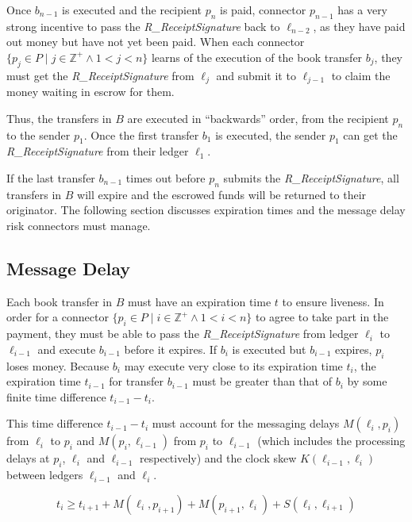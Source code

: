 \documentclass[letterpaper,twocolumn,10pt]{article}
\begin{document}
Once $b_{n-1}$ is executed and the recipient $p_n$ is paid, connector $p_{n-1}$ has a very strong incentive to pass the \textit{R\_ReceiptSignature} back to $\ell_{n-2}$, as they have paid out money but have not yet been paid. When each connector $ \{ p_j \in P \mid j \in \mathbb{Z}^+ \land 1 < j < n \} $ learns of the execution of the book transfer $b_j$, they must get the \textit{R\_ReceiptSignature} from $\ell_j$ and submit it to $\ell_{j-1}$ to claim the money waiting in escrow for them.

Thus, the transfers in $B$ are executed in ``backwards'' order, from the recipient $p_n$ to the sender $p_1$. Once the first transfer $b_1$ is executed, the sender $p_1$ can get the \textit{R\_ReceiptSignature} from their ledger $\ell_1$.

If the last transfer $b_{n-1}$ times out before $p_n$ submits the \textit{R\_ReceiptSignature}, all transfers in $B$ will expire and the escrowed funds will be returned to their originator. The following section discusses expiration times and the message delay risk connectors must manage.


\subsection{Message Delay}
\label{subsec:message-delay}

Each book transfer in $B$ must have an expiration time $t$ to ensure liveness. In order for a connector $ \{ p_i \in P \mid i \in \mathbb{Z}^+ \land 1 < i < n \} $ to agree to take part in the payment, they must be able to pass the \textit{R\_ReceiptSignature} from ledger $\ell_i$ to $\ell_{i-1}$ and execute $b_{i-1}$ before it expires. If $b_i$ is executed but $b_{i-1}$ expires, $p_i$ loses money. Because $b_i$ may execute very close to its expiration time $t_i$, the expiration time $t_{i-1}$ for transfer $b_{i-1}$ must be greater than that of $b_i$ by some finite time difference $t_{i-1} - t_i$.

This time difference $t_{i-1} - t_i$ must account for the messaging delays $M(\ell_i, p_i)$ from $\ell_i$ to $p_i$ and $M(p_i, \ell_{i-1})$ from $p_i$ to $\ell_{i-1}$ (which includes the processing delays at $p_i$, $\ell_i$ and $\ell_{i-1}$ respectively) and the clock skew $K(\ell_{i-1}, \ell_i)$ between ledgers $\ell_{i-1}$ and $\ell_i$.

\begin{equation}
\label{eq:expiration-delta}
t_i \geq t_{i+1} + M(\ell_i, p_{i+1}) + M(p_{i+1}, \ell_i) + S(\ell_i, \ell_{i+1})
\end{equation}
\end{document}
